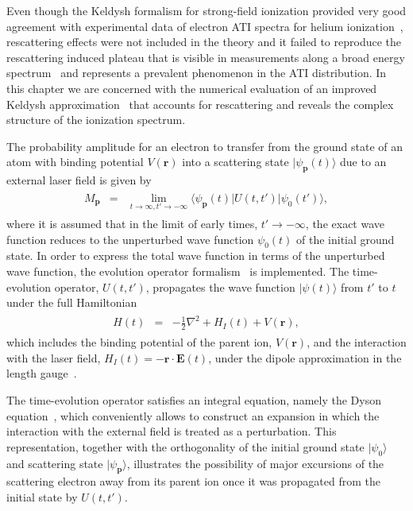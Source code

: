 Even though the Keldysh formalism for strong-field ionization provided
very good agreement with experimental data of electron ATI spectra for
helium ionization~\cite{Walker_1994exp}, rescattering effects were not
included in the theory and it failed to reproduce the rescattering
induced plateau that is visible in measurements along a broad energy
spectrum~\cite{Paulus_1994plateau, Walker_1996} and represents a
prevalent phenomenon in the ATI distribution. In this chapter we are
concerned with the numerical evaluation of an improved Keldysh
approximation~\cite{Kopold_1997sfa} that accounts for rescattering and
reveals the complex structure of the ionization spectrum.

The probability amplitude for an electron to transfer from the ground
state of an atom with binding potential $V(\mathbf{r})$ into a
scattering state $|\psi_{\mathbf{p}}(t)\rangle$ due to an external
laser field is given by~\cite{Kopold_1997sfa}
\begin{eqnarray}
\label{eq:matrix_element}
\begin{split}
M_{\mathbf{p}} & = & \lim_{t\to\infty,t'\to -\infty}
{\langle \psi_{\mathbf{p}}(t) | U(t,t') | \psi_{0}(t') \rangle},
\end{split}
\end{eqnarray}
where it is assumed that in the limit of early times, $t'\to -\infty$,
the exact wave function reduces to the unperturbed wave function
$\psi_{0}(t)$ of the initial ground state. In order to express the
total wave function in terms of the unperturbed wave function, the
evolution operator formalism~\cite{BeckerTEOp_2006} is
implemented. The time-evolution operator, $U(t,t')$, propagates the
wave function $|\psi(t)\rangle$ from $t'$ to $t$ under the full
Hamiltonian
\begin{eqnarray}
\label{eq:H_ati}
\begin{split}
H(t) & = & -\frac{1}{2} \nabla^{2} + H_{I}(t) + V(\mathbf{r}),
\end{split}
\end{eqnarray}
which includes the binding potential of the parent ion,
$V(\mathbf{r})$, and the interaction with the laser field,
$H_{I}(t)=-\mathbf{r}\cdot\mathbf{E}(t)$, under the dipole
approximation in the length gauge~\cite{Kopold_1997sfa}.

The time-evolution operator satisfies an integral equation, namely the
Dyson equation~\cite{Kopold_1997sfa, cjp2010_keldysh}, which
conveniently allows to construct an expansion in which the interaction
with the external field is treated as a perturbation. This
representation, together with the orthogonality of the initial ground
state $|\psi_{0}\rangle$ and scattering state
$|\psi_{\mathbf{p}}\rangle$, illustrates the possibility of major
excursions of the scattering electron away from its parent ion once it
was propagated from the initial state by $U(t,t')$.


